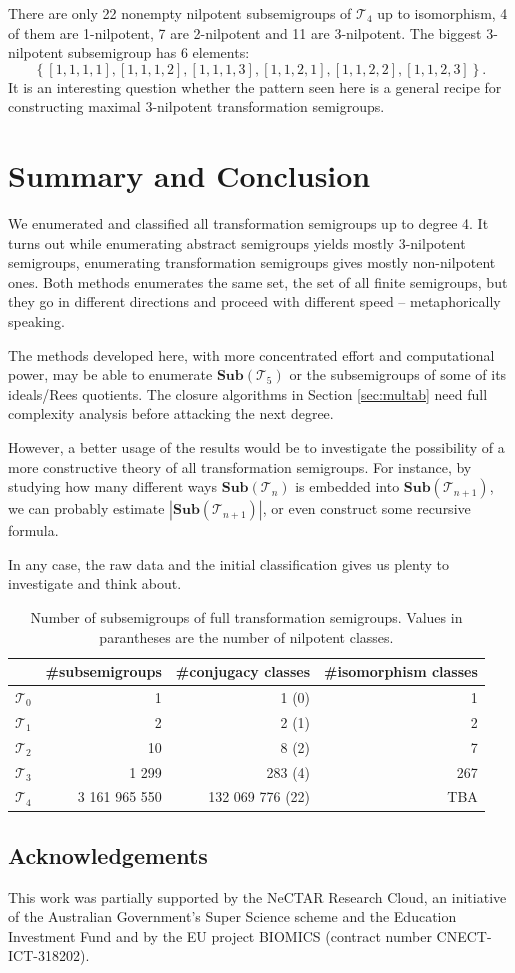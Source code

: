 \documentclass{amsart}
\newcommand{\cT}{{\mathcal T}}
\newcommand{\Sub}{\mathbf{Sub}}
\theoremstyle{plain}
\theoremstyle{definition}
\begin{document}
There are only 22 nonempty nilpotent subsemigroups of $\cT_4$ up to isomorphism, 4 of them are 1-nilpotent, 7 are 2-nilpotent and 11 are 3-nilpotent.
The biggest 3-nilpotent subsemigroup has 6 elements:
$$\left\{[1,1,1,1],[1,1,1,2],[1,1,1,3],[1,1,2,1],[1,1,2,2],[1,1,2,3]\right\}.$$
It is an interesting question whether the pattern seen here is a general recipe for constructing maximal 3-nilpotent transformation semigroups.
\section{Summary and Conclusion}
We enumerated and classified all transformation semigroups up to degree 4.
It turns out while enumerating abstract semigroups yields mostly 3-nilpotent semigroups, enumerating transformation semigroups gives mostly non-nilpotent ones.
Both methods enumerates the same set, the set of all finite semigroups, but they go in different directions and proceed with different speed -- metaphorically speaking. 

The methods developed here, with more concentrated effort and computational power,  may be able to enumerate $\Sub(\cT_5)$ or the subsemigroups of some of its ideals/Rees quotients. 
The closure algorithms in Section \ref{sec:multab} need full complexity analysis before attacking the next degree. 

However, a better usage of the results would be to investigate the possibility of a more constructive theory of all transformation semigroups.
For instance, by studying how many different ways $\Sub(\cT_n)$ is embedded into $\Sub(\cT_{n+1})$, we can probably estimate $|\Sub(\cT_{n+1})|$, or even construct some recursive formula.

In any case, the raw data and the initial classification gives us plenty to investigate and think about.
\begin{table}
\renewcommand{\arraystretch}{1}
\begin{tabular}{|c|r|r|r|}
\hline
 & \#subsemigroups & \#conjugacy classes & \#isomorphism classes \\
\hline
$\cT_0$ & 1  & 1 (0)& 1\\
\hline
$\cT_1$ & 2  & 2 (1)& 2\\
\hline
$\cT_2$ & 10  & 8 (2)& 7\\
\hline
$\cT_3$ & 1 299 & 283 (4)& 267\\
\hline
$\cT_4$ & 3 161 965 550 & 132 069 776 (22)& TBA\\
\hline
\end{tabular}
\caption{Number of subsemigroups of full transformation semigroups. Values in parantheses are the number of nilpotent classes.}
\end{table}

\subsection*{Acknowledgements}
This work was partially supported by the NeCTAR Research Cloud, an
initiative of the Australian Government's Super Science scheme and the
Education Investment Fund and by the EU project BIOMICS (contract number CNECT-ICT-318202).



\end{document}
